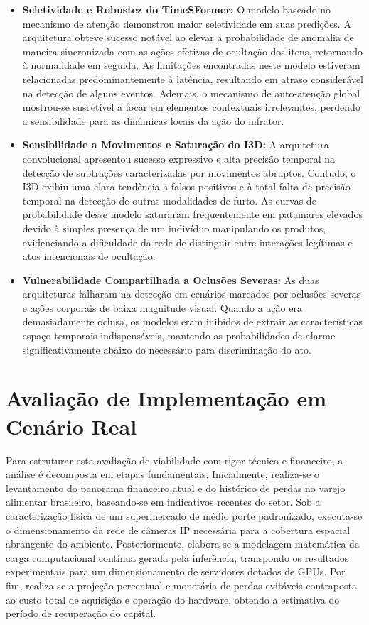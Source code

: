 \documentclass[12pt, %
openright, 
oneside, %
a4paper,    %
brazil]{facom-ufu-abntex2}
\begin{document}
\begin{itemize}
\item \textbf{Seletividade e Robustez do TimeSFormer:} O modelo baseado no mecanismo de atenção demonstrou maior seletividade em suas predições. A arquitetura obteve sucesso notável ao elevar a probabilidade de anomalia de maneira sincronizada com as ações efetivas de ocultação dos itens, retornando à normalidade em seguida. As limitações encontradas neste modelo estiveram relacionadas predominantemente à latência, resultando em atraso considerável na detecção de alguns eventos. Ademais, o mecanismo de auto-atenção global mostrou-se suscetível a focar em elementos contextuais irrelevantes, perdendo a sensibilidade para as dinâmicas locais da ação do infrator.

\item \textbf{Sensibilidade a Movimentos e Saturação do I3D:} A arquitetura convolucional apresentou sucesso expressivo e alta precisão temporal na detecção de subtrações caracterizadas por movimentos abruptos. Contudo, o I3D exibiu uma clara tendência a falsos positivos e à total falta de precisão temporal na detecção de outras modalidades de furto. As curvas de probabilidade desse modelo saturaram frequentemente em patamares elevados devido à simples presença de um indivíduo manipulando os produtos, evidenciando a dificuldade da rede de distinguir entre interações legítimas e atos intencionais de ocultação.

\item \textbf{Vulnerabilidade Compartilhada a Oclusões Severas:} As duas arquiteturas falharam na detecção em cenários marcados por oclusões severas e ações corporais de baixa magnitude visual. Quando a ação era demasiadamente oclusa, os modelos eram inibidos de extrair as características espaço-temporais indispensáveis, mantendo as probabilidades de alarme significativamente abaixo do necessário para discriminação do ato.
\end{itemize}

\chapter[Avaliação de Implementação em Cenário Real]{Avaliação de Implementação em Cenário Real}
Para estruturar esta avaliação de viabilidade com rigor técnico e financeiro, a análise é decomposta em etapas fundamentais.
Inicialmente, realiza-se o levantamento do panorama financeiro atual e do histórico de perdas no varejo alimentar brasileiro, baseando-se em indicativos recentes do setor.
Sob a caracterização física de um supermercado de médio porte padronizado, executa-se o dimensionamento da rede de câmeras IP necessária para a cobertura espacial abrangente do ambiente.
Posteriormente, elabora-se a modelagem matemática da carga computacional contínua gerada pela inferência, transpondo os resultados experimentais para um dimensionamento de servidores dotados de GPUs.
Por fim, realiza-se a projeção percentual e monetária de perdas evitáveis contraposta ao custo total de aquisição e operação do hardware, obtendo a estimativa do período de recuperação do capital.
\end{document}
